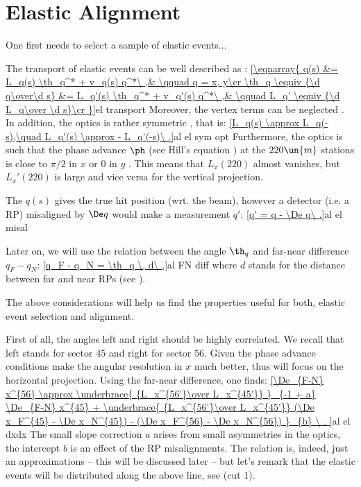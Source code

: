 \section[al elast]{Elastic Alignment}


One first needs to select a sample of elastic events...

The transport of elastic events can be well described as :
\eqref{\eqnarray{
q(s) &= L_q(s) \th_q^* + v_q(s) q^*\ ,& \qquad q = x, y\cr
\th_q \equiv {\d q\over\d s} &= L_q'(s) \th_q^* + v_q'(s) q^*\ ,& \qquad L_q' \equiv {\d L_q\over \d s}\cr
}}{el transport}
Moreover, the vertex terms can be neglected . In addition, the optics is rather symmetric , that is:
\eqref{L_q(s) \approx L_q(-s),\quad L_q'(s) \approx - L_q'(-s)\ .}{al el sym opt}
Furthermore, the optics is such that the phase advance $\ph$ (see Hill's equation ) at the $220\un{m}$ stations is close to $\pi/2$ in $x$ or $0$ in $y$ . This means that $L_x(220)$ almost vanishes, but $L_x'(220)$ is large and vice versa for the vertical projection.

The $q(s)$ gives the true hit position (wrt. the beam), however a detector (i.e. a RP) misaligned by $\De q$ would make a measurement $q'$:
\eqref{q' = q - \De q\ .}{al el misal}

Later on, we will use the relation between the angle $\th_q$ and far-near difference $q_F - q_N$:
\eqref{q_F - q_N = \th_q \, d\ ,}{al FN diff}
where $d$ stands for the distance between far and near RPs (see ).

The above considerations will help us find the properties useful for both, elastic event selection and alignment.

First of all, the angles left and right should be highly correlated. We recall that left stands for sector 45 and right for sector 56. Given the phase advance conditions make the angular resolution in $x$ much better, thus will focus on the horizontal projection. Using the far-near difference, one finds:
\eqref{\De_{F-N} x^{56} \approx \underbrace{ {L_x^{56'}\over L_x^{45'}} }_{-1 + a} \De_{F-N} x^{45} + 
\underbrace{ {L_x^{56'}\over L_x^{45'}} (\De x_F^{45} - \De x_N^{45}) - (\De x_F^{56} - \De x_N^{56}) }_{b} \ .
}{al el dxdx}
The small slope correction $a$ arises from small asymmetries in the optics, the intercept $b$ is an effect of the RP misalignments. The relation is, indeed, just an approximations -- this will be discussed later -- but let's remark that the elastic events will be distributed along the above line, see  (cut 1).

